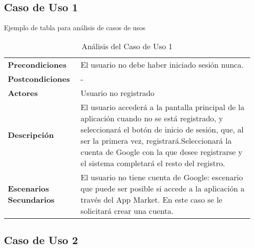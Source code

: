 
\subsection{Caso de Uso 1} 

\textcolor[rgb]{0.65,0.16,0}{Ejemplo de tabla para análisis de casos de usos}

\begin{table}[H]
  \centering
  \vspace{-5mm}
  \caption{Análisis del Caso de Uso 1}
    \begin{tabular}{p{7.5em}p{24.145em}}
    \toprule
    \rowcolor[rgb]{ .871,  .918,  .965} \multicolumn{2}{p{31.645em}}{\textbf{Registro}} \\
    \midrule
    \rowcolor[rgb]{ .906,  .902,  .902} \textbf{Precondiciones} & \cellcolor[rgb]{ 1,  1,  1}El usuario no debe haber iniciado sesión nunca. \\
    \midrule
    \rowcolor[rgb]{ .906,  .902,  .902} \textbf{Postcondiciones} & \cellcolor[rgb]{ 1,  1,  1}- \\
    \midrule
    \rowcolor[rgb]{ .906,  .902,  .902} \textbf{Actores} & \cellcolor[rgb]{ 1,  1,  1}Usuario no registrado \\
    \midrule
    \rowcolor[rgb]{ .906,  .902,  .902} \textbf{Descripción} & \cellcolor[rgb]{ 1,  1,  1}El usuario accederá a la pantalla principal de la aplicación cuando no se está registrado, y seleccionará el botón de inicio de sesión, que, al ser la primera vez, registrará.Seleccionará la cuenta de Google con la que desee registrarse y el sistema completará el resto del registro. \\
    \midrule
    \rowcolor[rgb]{ .906,  .902,  .902} \textbf{Escenarios          Secundarios} & \cellcolor[rgb]{ 1,  1,  1} El usuario no tiene cuenta de Google: escenario que puede ser posible si accede a la aplicación a través del App Market. En este caso se le solicitará crear una cuenta. \\
    \bottomrule
    \end{tabular}%
\end{table}%
 
\subsection{Caso de Uso 2}

